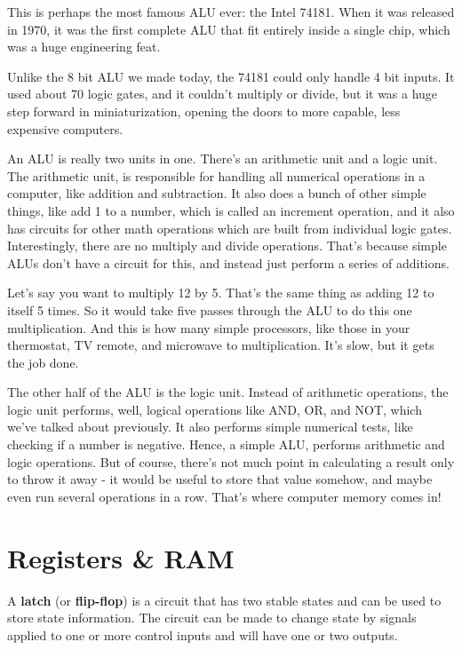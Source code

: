 \be
This is perhaps the most famous ALU ever: the Intel 74181. When it was released in 1970, it was the first complete
ALU that fit entirely inside a single chip, which was a huge engineering feat.


Unlike the 8 bit ALU we made today, the 74181 could only handle 4 bit inputs. It used about 70 logic gates, and it
couldn't multiply or divide, but it was a huge step forward in miniaturization, opening the doors to more capable,
less expensive computers.
\ee

An ALU is really two units in one. There's an arithmetic unit and a logic unit. The arithmetic unit, is responsible
for handling all numerical operations in a computer, like addition and subtraction. It also does a bunch of other
simple things, like add 1 to a number, which is called an increment operation, and it also has circuits for other
math operations which are built from individual logic gates. Interestingly, there are no multiply and divide
operations. That's because simple ALUs don't have a circuit for this, and instead just perform a series of additions.

\be
Let's say you want to multiply 12 by 5. That's the same thing as adding 12 to itself 5 times. So it would take five
passes through the ALU to do this one multiplication. And this is how many simple processors, like those in your
thermostat, TV remote, and microwave to multiplication. It's slow, but it gets the job done.
\ee

The other half of the ALU is the logic unit. Instead of arithmetic operations, the logic unit performs, well, logical
operations like AND, OR, and NOT, which we've talked about previously. It also performs simple numerical tests, like
checking if a number is negative. Hence, a simple ALU, performs arithmetic and logic operations. But of course,
there's not much point in calculating a result only to throw it away - it would be useful to store that value
somehow, and maybe even run several operations in a row. That's where computer memory comes in!

\section{Registers \& RAM}

A \textbf{latch} (or \textbf{flip-flop}) is a circuit that has two stable states and can be used to store state
information. The circuit can be made to change state by signals applied to one or more control inputs and will have one
or two outputs.
\ed

